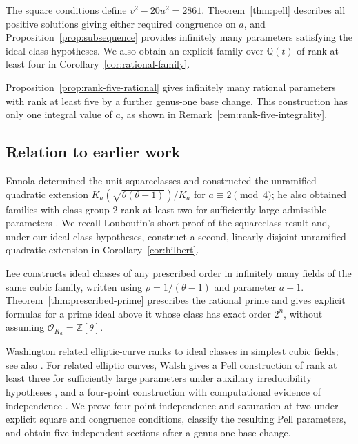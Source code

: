 \documentclass[11pt,leqno,oneside,letterpaper]{amsart}
\theoremstyle{remark}
\numberwithin{equation}{section}
\newcommand{\Q}{\mathbb Q}
\newcommand{\Z}{\mathbb Z}
\begin{document}
The square conditions define $v^2-20u^2=2861$. Theorem~\ref{thm:pell} describes all positive solutions giving either required congruence on $a$, and Proposition~\ref{prop:subsequence} provides infinitely many parameters satisfying the ideal-class hypotheses. We also obtain an explicit family over $\Q(t)$ of rank at least four in Corollary~\ref{cor:rational-family}.

Proposition~\ref{prop:rank-five-rational} gives infinitely many rational parameters with rank at least five by a further genus-one base change. This construction has only one integral value of $a$, as shown in Remark~\ref{rem:rank-five-integrality}.

\subsection*{Relation to earlier work}

Ennola determined the unit squareclasses and constructed the unramified quadratic extension $K_a(\sqrt{\theta(\theta-1)})/K_a$ for $a\equiv2\pmod4$; he also obtained families with class-group $2$-rank at least two for sufficiently large admissible parameters \cite[Propositions 3.3 and 6.1, Theorem 6.1]{Ennola1991}. We recall Louboutin's short proof of the squareclass result \cite[Lemma 6]{Louboutin2017} and, under our ideal-class hypotheses, construct a second, linearly disjoint unramified quadratic extension in Corollary~\ref{cor:hilbert}.

Lee \cite[Theorem 1.1]{Lee2010} constructs ideal classes of any prescribed order in infinitely many fields of the same cubic family, written using $\rho=1/(\theta-1)$ and parameter $a+1$. Theorem~\ref{thm:prescribed-prime} prescribes the rational prime and gives explicit formulas for a prime ideal above it whose class has exact order $2^n$, without assuming $\mathcal O_{K_a}=\Z[\theta]$.

Washington \cite[\S3, Theorem 1]{Washington1987} related elliptic-curve ranks to ideal classes in simplest cubic fields; see also \cite{Duquesne2001,Laoudi2006}. For related elliptic curves, Walsh gives a Pell construction of rank at least three for sufficiently large parameters under auxiliary irreducibility hypotheses \cite[Theorem 1.1]{Walsh2023}, and a four-point construction with computational evidence of independence \cite[\S2, Type III]{Walsh2024}. We prove four-point independence and saturation at two under explicit square and congruence conditions, classify the resulting Pell parameters, and obtain five independent sections after a genus-one base change.
\end{document}
